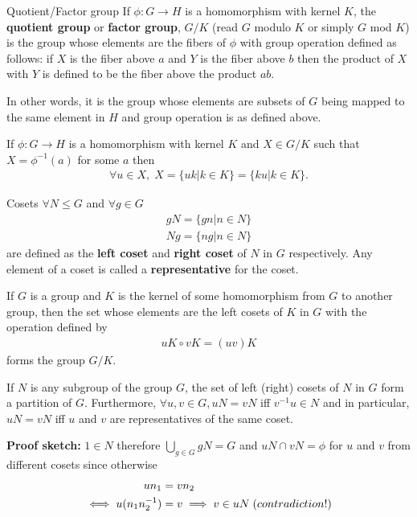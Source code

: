 \documentclass[titlepage, 12pt]{article}
\begin{document}
\begin{definition}{Quotient/Factor group}{}
    If $\phi:G\rightarrow H$ is a homomorphism with kernel $K$, the
    \textbf{quotient group} or \textbf{factor group}, $G/K$ (read $G$ modulo $K$
    or simply $G$ mod $K$) is the group whose elements are the fibers of $\phi$
    with group operation defined as follows: if $X$ is the fiber above $a$ and
    $Y$ is the fiber above $b$ then the product of $X$ with $Y$ is defined to be
    the fiber above the product $ab$.
\end{definition}
In other words, it is the group whose elements are subsets of $G$ being mapped
to the same element in $H$ and group operation is as defined above.

\begin{proposition}{}{}
    If $\phi:G\rightarrow H$ is a homomorphism with kernel $K$ and $X\in G/K$
    such that $X = \phi^{-1}(a)$ for some $a$ then \begin{gather*} \forall u\in X,\;X = \{uk | k\in K\} = \{ku | k\in K\}.
    \end{gather*}
\end{proposition}
\begin{definition}{Cosets}{}
    $\forall N\le G$ and $\forall g\in G$
    \begin{gather*}
       gN = \{gn | n\in N\}\\
       Ng = \{ng | n\in N\}
    \end{gather*}
    are defined as the \textbf{left coset} and \textbf{right coset} of $N$ in
    $G$ respectively. Any element of a coset is called a \textbf{representative}
    for the coset.
\end{definition}
\begin{theorem}{}{}
    If $G$ is a group and $K$ is the kernel of some homomorphism from $G$ to
    another group, then the set whose elements are the left cosets of $K$ in $G$
    with the operation defined by
    \begin{gather*}
        uK\circ vK = (uv)K
    \end{gather*}
    forms the group $G/K$.
\end{theorem}
\begin{proposition}{}{}
    If $N$ is any subgroup of the group $G$, the set of left (right) cosets of $N$ in
    $G$ form a partition of $G$. Furthermore, $\forall u, v\in G, uN = vN$ iff
    $v^{-1}u\in N$ and in particular, $uN = vN$ iff $u$ and $v$ are
    representatives of the same coset.
\end{proposition}
\textbf{Proof sketch:} $1\in N$ therefore $\bigcup\limits_{g\in G} gN = G$ and
$uN\cap vN = \phi$ for $u$ and $v$ from different cosets since otherwise
\begin{align*}
    un_1 &= vn_2\\
    \iff u(n_1n_2^{-1}) &= v\implies v\in uN\;\textrm(contradiction!)
\end{align*}
\end{document}

